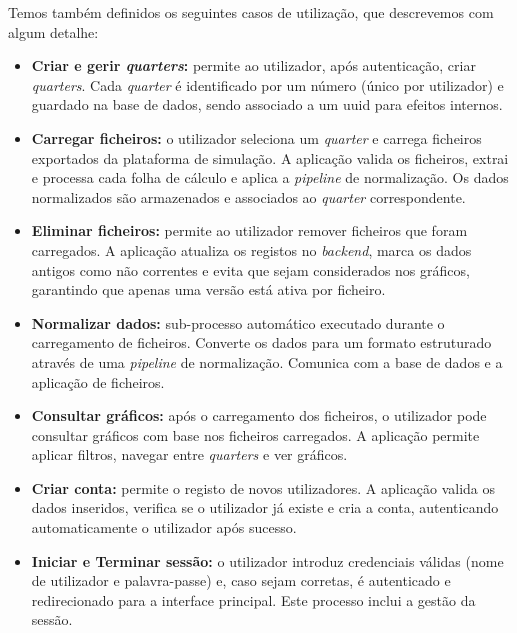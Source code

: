 Temos também definidos os seguintes casos de utilização, que descrevemos com algum detalhe:
\begin{itemize}
    \item \textbf{Criar e gerir \textit{quarters}:} permite ao utilizador, após autenticação, criar \textit{quarters}. Cada \textit{quarter} é identificado por um número (único por utilizador) e guardado na base de dados, sendo associado a um \gls{uuid} para efeitos internos.

    \item \textbf{Carregar ficheiros:} o utilizador seleciona um \textit{quarter} e carrega ficheiros exportados da plataforma de simulação. A aplicação valida os ficheiros, extrai e processa cada folha de cálculo e aplica a \textit{pipeline} de normalização. Os dados normalizados são armazenados e associados ao \textit{quarter} correspondente.

    \item \textbf{Eliminar ficheiros:} permite ao utilizador remover ficheiros que foram carregados. A aplicação atualiza os registos no \textit{backend}, marca os dados antigos como não correntes e evita que sejam considerados nos gráficos, garantindo que apenas uma versão está ativa por ficheiro.

    \item \textbf{Normalizar dados:} sub-processo automático executado durante o carregamento de ficheiros. Converte os dados para um formato estruturado através de uma \textit{pipeline} de normalização. Comunica com a base de dados e a aplicação de ficheiros.

    \item \textbf{Consultar gráficos:} após o carregamento dos ficheiros, o utilizador pode consultar gráficos com base nos ficheiros carregados. A aplicação permite aplicar filtros, navegar entre \textit{quarters} e ver gráficos.

    \item \textbf{Criar conta:} permite o registo de novos utilizadores. A aplicação valida os dados inseridos, verifica se o utilizador já existe e cria a conta, autenticando automaticamente o utilizador após sucesso.

    \item \textbf{Iniciar e Terminar sessão:} o utilizador introduz credenciais válidas (nome de utilizador e palavra-passe) e, caso sejam corretas, é autenticado e redirecionado para a interface principal. Este processo inclui a gestão da sessão.

\end{itemize}

